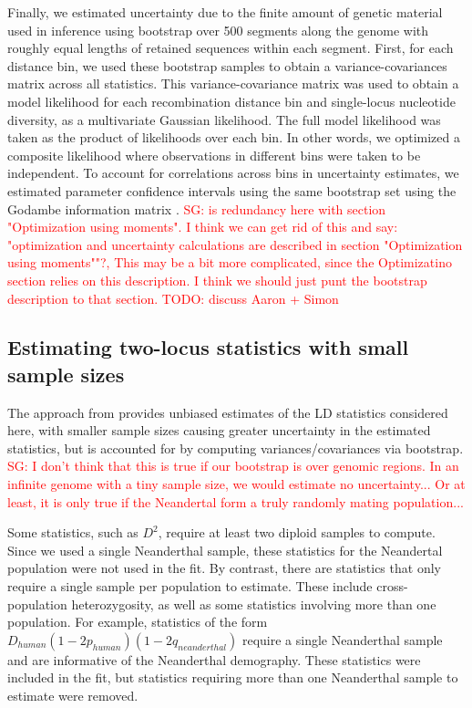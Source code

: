 \documentclass[]{article}
\newcommand{\sgcomment}[1]{{\textcolor{red}{SG: #1}}}
\begin{document}
Finally, we estimated uncertainty due to the finite amount of genetic material
used in inference using bootstrap over 500 segments along the genome with
roughly equal lengths of retained sequences within each segment. First, for
each distance bin, we used these bootstrap samples to obtain a
variance-covariances matrix across all statistics. This variance-covariance
matrix was used to obtain a model likelihood for each recombination distance
bin and single-locus nucleotide diversity, as a multivariate Gaussian
likelihood. The full model likelihood was taken as the product of likelihoods
over each bin. In other words, we optimized a composite likelihood where
observations in different bins were taken to be independent. To account for
correlations across bins in uncertainty estimates, we estimated parameter
confidence intervals using the same bootstrap set using the Godambe information
matrix \citep{Coffman2016-yq}. \sgcomment{is redundancy here with section
"Optimization using moments". I think we can get rid of this and say:
"optimization and uncertainty calculations are described in section
"Optimization using moments""?, This may be a bit more complicated, since the
Optimizatino section relies on this description. I think we should just punt
the bootstrap description to that section. TODO: discuss Aaron + Simon}

\subsection{Estimating two-locus statistics with small sample sizes}

The approach from \citet{Ragsdale2020-nz} provides unbiased estimates of the LD
statistics considered here, with smaller sample sizes causing greater
uncertainty in the estimated statistics, but is accounted for by computing
variances/covariances via bootstrap. \sgcomment{I don't think that this is true
if our bootstrap is over genomic regions. In an infinite genome with a tiny
sample size, we would estimate no uncertainty...  Or at least, it is only true
if the Neandertal form a truly randomly mating population...  }

Some statistics, such as $D^2$, require at least two diploid samples to
compute. Since we used a single Neanderthal sample, these statistics for the
Neandertal population were not used in the fit. By contrast, there are
statistics that only require a single sample per population to estimate. These
include cross-population heterozygosity, as well as some statistics involving
more than one population. For example, statistics of the form
$D_{human}(1-2p_{human})(1-2q_{neanderthal})$ require a single Neanderthal
sample and are informative of the Neanderthal demography. These statistics were
included in the fit, but statistics requiring more than one Neanderthal sample
to estimate were removed.
\end{document}
